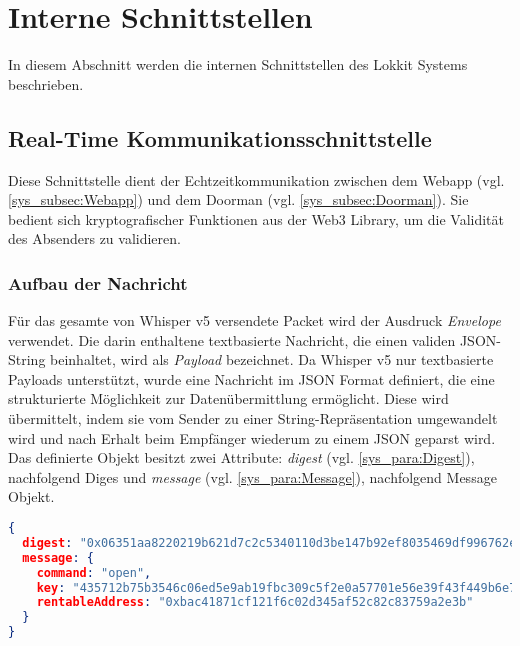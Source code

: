 \section{Interne Schnittstellen}
In diesem Abschnitt werden die internen Schnittstellen des Lokkit Systems beschrieben.

\subsection{Real-Time Kommunikationsschnittstelle}
\label{sys_subsec:Real_Time_Kommunikationsschnittstelle}
Diese Schnittstelle dient der Echtzeitkommunikation zwischen dem Webapp (vgl. \ref{sys_subsec:Webapp}) und dem Doorman (vgl. \ref{sys_subsec:Doorman}). Sie bedient sich kryptografischer Funktionen aus der Web3 Library, um die Validität des Absenders zu validieren.

\subsubsection{Aufbau der Nachricht}
Für das gesamte von Whisper v5 versendete Packet wird der Ausdruck \emph{Envelope} verwendet. Die darin enthaltene textbasierte Nachricht, die einen validen JSON-String beinhaltet, wird als \emph{Payload} bezeichnet. Da Whisper v5 nur textbasierte Payloads unterstützt, wurde eine Nachricht im \acrshort{JSON} Format definiert, die eine strukturierte Möglichkeit zur Datenübermittlung ermöglicht. Diese wird übermittelt, indem sie vom Sender zu einer String-Repräsentation umgewandelt wird und nach Erhalt beim Empfänger wiederum zu einem JSON geparst wird. Das definierte Objekt besitzt zwei Attribute: \emph{digest} (vgl. \ref{sys_para:Digest}), nachfolgend Diges und \emph{message} (vgl. \ref{sys_para:Message}), nachfolgend Message Objekt.

\begin{lstlisting}[language=json,caption={Beispiel einer Lokkit JSON Nachricht, deren \emph{digest} vom account \emph{0x55047206d03afef0d79bb2d90710bf9f23737860} erstellt wurde.}]
{
  digest: "0x06351aa8220219b621d7c2c5340110d3be147b92ef8035469df996762e021f512f4f8  30dee0ed1d59998b4bafaa3abb589668d940bdce867f7e6d83315a454af1b",
  message: {
    command: "open",
    key: "435712b75b3546c06ed5e9ab19fbc309c5f2e0a57701e56e39f43f449b6e72c9",
    rentableAddress: "0xbac41871cf121f6c02d345af52c82c83759a2e3b"
  }
}
\end{lstlisting}

